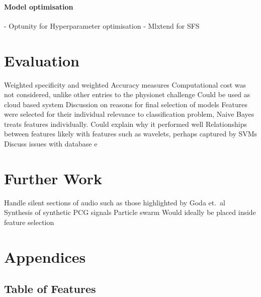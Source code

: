 \documentclass[titlepage, 12pt]{scrartcl} \usepackage{enumitem}
\begin{document}
\paragraph{Model optimisation}
- Optunity for Hyperparameter optimisation
- Mlxtend for SFS




\section{Evaluation}\label{Eval}
Weighted specificity and weighted Accuracy measures
Computational cost was not considered, unlike other entries to the physionet
challenge
Could be used as cloud based system
Discussion on reasons for final selection of models
Features were selected for their individual relevance to classification
problem, Naive Bayes treats features individually. Could explain why it
performed well
Relationships between features likely with features such as wavelets, perhaps
captured by SVMs
Discuss issues with database e
\section{Further Work}\label{FurtherWork}
Handle silent sections of audio such as those highlighted by Goda et.\
al~\parencite{Goda2016}
Synthesis of synthetic PCG signals
Particle swarm Would ideally be placed inside feature selection

\appendix
\section*{Appendices}
\renewcommand{\thesubsection}{\Alph{subsection}}
\subsection{Table of Features}\label{appendixA}
\end{document}

